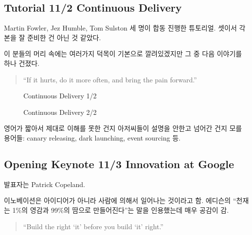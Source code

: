 \documentclass[a4paper]{article}
\begin{document}
\subsection{Tutorial 11/2 Continuous Delivery}

Martin Fowler, Jez Humble, Tom Sulston 세 명이 합동 진행한 튜토리얼.
셋이서 각본을 잘 준비한 건 아닌 것 같았다.

이 분들의 머리 속에는 여러가지 덕목이 기본으로 깔려있겠지만 그 중 다음
이야기를 하나 건졌다.

\begin{quote}
``If it hurts, do it more often, and bring the pain forward.''  
\end{quote}

\begin{figure}[t]
    \begin{Frame}
        \begin{center}
        \end{center}
    \end{Frame}
    \caption{Continuous Delivery 1/2}
    \label{Continuous Delivery 1}
\end{figure}

\begin{figure}[t]
    \begin{Frame}
        \begin{center}
        \end{center}
    \end{Frame}
    \caption{Continuous Delivery 2/2}
    \label{Continuous Delivery 2}
\end{figure}

영어가 짧아서 제대로 이해를 못한 건지 아저씨들이 설명을 안한고
넘어간 건지 모를 용어들: canary releasing, dark launching, event
sourcing 등.

\subsection{Opening Keynote 11/3 Innovation at Google}
 
발표자는 Patrick Copeland.
 
이노베이션은 아이디어가 아니라 사람에 의해서 일어나는 것이라고 함.
에디슨의 ``천재는 1\%의 영감과 99\%의 땀으로 만들어진다''는 말을
인용했는데 매우 공감이 감.
 
\begin{quote}
``Build the right `it' before you build `it' right.''
\end{quote}
 
\end{document}
